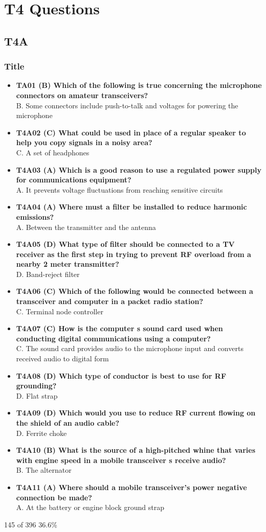 \documentclass[10pt]{beamer}
\begin{document}
\section{T4 Questions}
\subsection{T4A}
\begin{frame}
\frametitle{Title}
\begin{itemize}[<+->]
\tiny
\item\textbf{TA01 (B) Which of the following is true concerning the microphone connectors on amateur transceivers?}\\ B. Some connectors include push-to-talk and voltages for powering the microphone
\item\textbf{T4A02 (C) What could be used in place of a regular speaker to help you copy signals in a noisy area?}\\ C. A set of headphones
\item\textbf{T4A03 (A) Which is a good reason to use a regulated power supply for communications equipment?}\\ A. It prevents voltage fluctuations from reaching sensitive circuits
\item\textbf{T4A04 (A) Where must a filter be installed to reduce harmonic emissions?}\\ A. Between the transmitter and the antenna
\item\textbf{T4A05 (D) What type of filter should be connected to a TV receiver as the first step in trying to prevent RF overload from a nearby 2 meter transmitter?}\\ D. Band-reject filter
\item\textbf{T4A06 (C) Which of the following would be connected between a transceiver and computer in a packet radio station?}\\ C. Terminal node controller
\item\textbf{T4A07 (C) How is the computer s sound card used when conducting digital communications using a computer?}\\ C. The sound card provides audio to the microphone input and converts received audio to digital form
\item\textbf{T4A08 (D) Which type of conductor is best to use for RF grounding?}\\ D. Flat strap
\item\textbf{T4A09 (D) Which would you use to reduce RF current flowing on the shield of an audio cable?}\\ D. Ferrite choke
\item\textbf{T4A10 (B) What is the source of a high-pitched whine that varies with engine speed in a mobile transceiver s receive audio?}\\ B. The alternator
\item\textbf{T4A11 (A) Where should a mobile transceiver's power negative connection be made?}\\ A. At the battery or engine block ground strap
\end{itemize}
\tiny 145 of 396  36.6\%
\end{frame}
\end{document}
